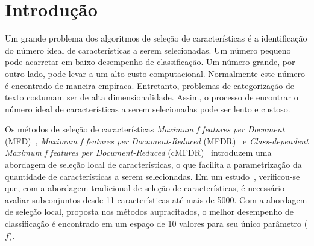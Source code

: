 \documentclass[conference]{IEEEtran}
\begin{document}

\section{Introdução}
\label{sec:intro}

Um grande problema dos algoritmos de seleção de características é a identificação do número ideal de características a serem selecionadas. Um número pequeno pode acarretar em baixo desempenho de classificação. Um número grande, por outro lado, pode levar a um alto custo computacional. Normalmente este número é encontrado de maneira empíraca. Entretanto, problemas de categorização de texto costumam ser de alta dimensionalidade. Assim, o processo de encontrar o número ideal de características a serem selecionadas pode ser lento e custoso.

Os métodos de seleção de características \textit{Maximum f features per Document} (MFD)~\cite{mfd2014}, \textit{Maximum f features per Document-Reduced} (MFDR)~\cite{mfd2014} e \textit{Class-dependent Maximum f features per Document-Reduced} (cMFDR)~\cite{fragoso2016cmfdr} introduzem uma abordagem de seleção local de características,  o que facilita a parametrização da quantidade de características a serem selecionadas. Em um estudo~\cite{mfd2014}, verificou-se que, com a abordagem tradicional de seleção de características, é necessário avaliar subconjuntos desde 11 características até mais de 5000. Com a abordagem de seleção local, proposta nos métodos aupracitados, o melhor desempenho de classificação é encontrado em um espaço de 10 valores para seu único parâmetro ($f$). 
\end{document}
